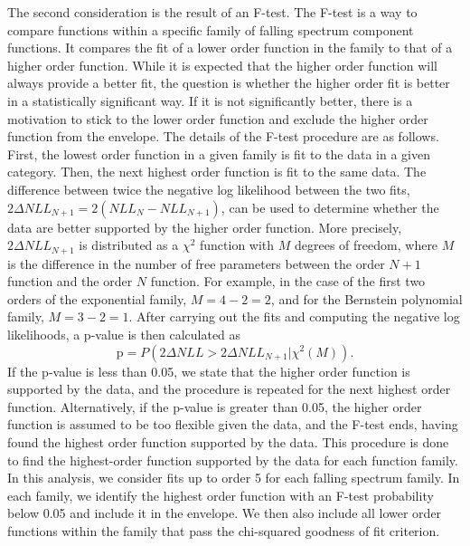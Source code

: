 The second consideration is the result of an F-test. The F-test is a way to compare functions within a specific family of 
falling spectrum component functions. It compares the fit of a lower order function in the family to that of a higher order function. 
While it is expected that the higher order function will always provide a better fit, the question is whether the higher order 
fit is better in a statistically significant way. If it is not significantly better, there is a motivation to stick to the lower
order function and exclude the higher order function from the envelope. The details of the F-test procedure are as follows. 
First, the lowest order function in a given family is fit to the data in a given
category. Then, the next highest order function is fit to the same data. The difference between twice 
the negative log likelihood between the two fits, $2\Delta NLL_{N+1} = 2(NLL_{N}-NLL_{N+1})$, 
can be used to determine whether the data are better supported by the higher order function. 
More precisely, $2\Delta NLL_{N+1}$ is distributed as a $\chi^{2}$ function with $M$ degrees of 
freedom, where $M$ is the difference in the number of free parameters between the order $N+1$ 
function and the order $N$ function. For example, in the case of the first two orders of 
the exponential family, $M = 4-2 = 2$, and for the Bernstein polynomial family, $M=3-2=1$. 
After carrying out the fits and computing the negative log likelihoods, a p-value is then 
calculated as 
\begin{equation}
\mathrm{p} = P(2\Delta NLL > 2\Delta NLL_{N+1} | \chi^{2}(M)).
\end{equation}
If the p-value is less than 0.05, we state that the higher order function is supported by the 
data, and the procedure is repeated for the next highest order function. Alternatively, if the 
p-value is greater than 0.05, the higher order function is assumed to be too flexible given 
the data, and the F-test ends, having found the highest order function supported by the data.
This procedure is done to find the highest-order function supported by the data for each function 
family. In this analysis, we consider fits up to order 5 for each falling spectrum family.
In each family, we identify the highest order function with an F-test probability below 0.05 and include it in the envelope. 
We then also include all lower order functions within the family that pass the chi-squared goodness of fit criterion.


